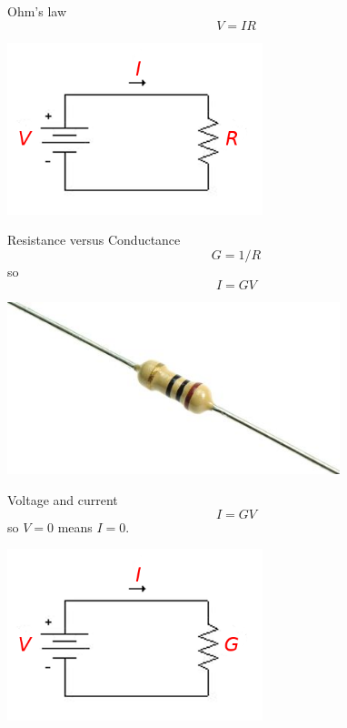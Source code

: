 \documentclass{beamer}
\newcommand{\crish}{\color{reddish}}
\newcommand{\cbla}{\color{black}}
\begin{document}
\begin{frame}{Ohm's law}
\crish
$$V=IR$$
\cbla
\begin{center}
    \includegraphics[height=5cm]{basic_circuit.png}
\end{center}
\end{frame}


\begin{frame}{Resistance versus Conductance}
\crish
$$G=1/R$$
\cbla{}so\crish
$$I=GV$$
\cbla
\begin{center}
    \includegraphics[height=5cm]{resistor.jpg}
\end{center}
\end{frame}


\begin{frame}{Voltage and current}
\crish
$$I=GV$$
\cbla{}so\crish{} $V=0$\cbla{} means \crish{} $I=0$\cbla{}.
\begin{center}
    \includegraphics[height=5cm]{basic_circuit_g.png}
\end{center}
\end{frame}
\end{document}
